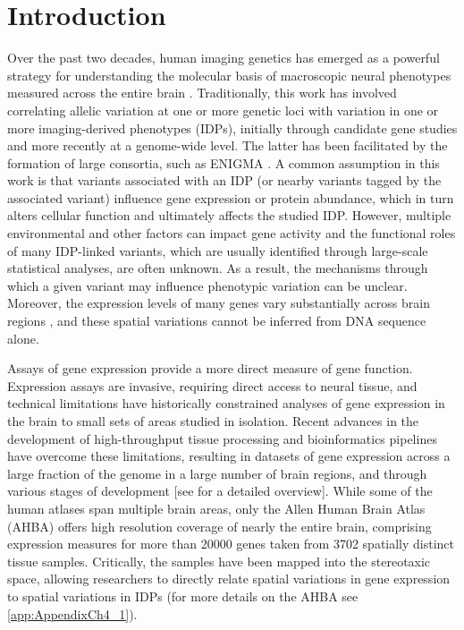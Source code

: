 \section{Introduction}

Over the past two decades, human imaging genetics has emerged as a powerful strategy for understanding the molecular basis of macroscopic neural phenotypes measured across the entire brain \citep{Meyer-Lindenberg2006a,Munoz2009,Arslan2015,Hashimoto2015}. Traditionally, this work has involved correlating allelic variation at one or more genetic loci with variation in one or more imaging-derived phenotypes (IDPs), initially through candidate gene studies and more recently at a genome-wide level. The latter has been facilitated by the formation of large consortia, such as ENIGMA \citep{Thompson2014}. A common assumption in this work is that variants associated with an IDP (or nearby variants tagged by the associated variant) influence gene expression or protein abundance, which in turn alters cellular function and ultimately affects the studied IDP. However, multiple environmental and other factors can impact gene activity \citep{Fraser2005,Choi2007,Cole2009} and the functional roles of many IDP-linked variants, which are usually identified through large-scale statistical analyses, are often unknown. As a result, the mechanisms through which a given variant may influence phenotypic variation can be unclear. Moreover, the expression levels of many genes vary substantially across brain regions \citep{Hawrylycz2015}, and these spatial variations cannot be inferred from DNA sequence alone.

Assays of gene expression provide a more direct measure of gene function. Expression assays are invasive, requiring direct access to neural tissue, and technical limitations have historically constrained analyses of gene expression in the brain to small sets of areas studied in isolation. Recent advances in the development of high-throughput tissue processing and bioinformatics pipelines have overcome these limitations, resulting in datasets of gene expression across a large fraction of the genome in a large number of brain regions, and through various stages of development [see \citet{Keil2018} for a detailed overview]. While some of the human atlases span multiple brain areas, only the Allen Human Brain Atlas (AHBA) offers high resolution coverage of nearly the entire brain, comprising expression measures for more than \num{20000} genes taken from \num{3702} spatially distinct tissue samples. Critically, the samples have been mapped into the stereotaxic space, allowing researchers to directly relate spatial variations in gene expression to spatial variations in IDPs (for more details on the AHBA see \ref{app:AppendixCh4_1}).

